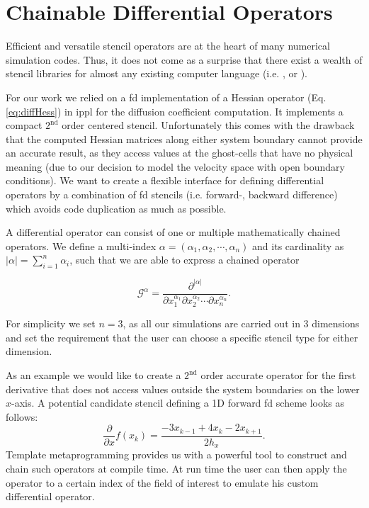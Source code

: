 \clearpage
\chapter{Chainable Differential Operators}
\label{appendix:chainable_operators}

Efficient and versatile stencil operators are at the heart of many numerical simulation codes.
Thus, it does not come as a surprise that there exist a wealth of stencil libraries for almost any
existing computer language (i.e. \cite{dahm2021gt4py}, \cite{stencilStream} or \cite{bianco2012generic}).

For our work we relied on a \gls{fd} implementation of a Hessian operator (Eq.
\ref{eq:diffHess}) in \gls{ippl}
\cite{adelmann2019opal} for the diffusion coefficient computation.
It implements a compact $2^{\text{nd}}$ order centered stencil. Unfortunately this comes with the
drawback that the computed Hessian matrices along either system boundary cannot provide an accurate
result, as they access values at the ghost-cells that have no physical meaning (due to our decision to 
model the velocity space with open boundary conditions). 
We want to create a flexible interface for defining differential
operators by a combination of \gls{fd} stencils (i.e. forward-, backward difference) which avoids
code duplication as much as possible.

A differential operator can consist of one or multiple mathematically chained operators. We define a multi-index $\alpha = (\alpha_1, \alpha_2, \cdots,
\alpha_n)$ and its cardinality as $\lvert \alpha \rvert = \sum_{i=1}^n \alpha_i$, such that we are able
to express a chained operator

\begin{equation}
    \mathcal G^{\alpha} = \frac{\partial^{\lvert \alpha \rvert}}{\partial
    x_1^{\alpha_1} \partial x_2^{\alpha_2} \cdots \partial x_n^{\alpha_n}}.
    \label{eq:chainedOperator}
\end{equation}

For simplicity we set $n=3$, as all our simulations are carried out in 3 dimensions and set the
requirement that the user can choose a specific stencil type for either dimension.

As an example we would like to create a $2^{\text{nd}}$ order accurate operator for the first
derivative that does not access values outside the system boundaries on the lower $x$-axis.
A potential candidate stencil defining a 1D forward \gls{fd} scheme looks as follows:
\begin{equation}
    \frac{\partial}{\partial x}f(x_k) = \frac{-3 x_{k-1} + 4 x_{k} - 2 x_{k+1}}{2h_x}.
    \label{eq:forwardStencil}
\end{equation}
Template metaprogramming provides us with a powerful tool to construct and chain such operators at
compile time. At run time the user can then apply the operator to a certain index of the field of
interest to emulate his custom differential operator.

